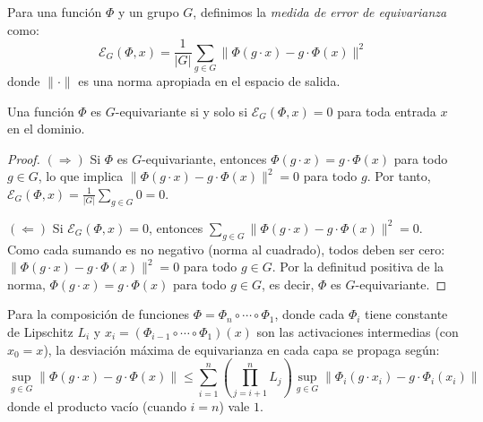\begin{definition}\label{def:error_equivarianza}
Para una función $\Phi$ y un grupo $G$, definimos la \textit{medida de error de equivarianza} como:
\begin{equation}
\mathcal{E}_G(\Phi, x) = \frac{1}{|G|} \sum_{g \in G} \|\Phi(g \cdot x) - g \cdot \Phi(x)\|^2
\end{equation}
donde $\|\cdot\|$ es una norma apropiada en el espacio de salida.
\end{definition}

\begin{theorem}\label{thm:criterio_equivarianza}
Una función $\Phi$ es $G$-equivariante si y solo si $\mathcal{E}_G(\Phi, x) = 0$ para toda entrada $x$ en el dominio.
\end{theorem}

\begin{proof}
$(\Rightarrow)$ Si $\Phi$ es $G$-equivariante, entonces $\Phi(g \cdot x) = g \cdot \Phi(x)$ para todo $g \in G$, lo que implica $\|\Phi(g \cdot x) - g \cdot \Phi(x)\|^2 = 0$ para todo $g$. Por tanto, $\mathcal{E}_G(\Phi, x) = \frac{1}{|G|} \sum_{g \in G} 0 = 0$.

$(\Leftarrow)$ Si $\mathcal{E}_G(\Phi, x) = 0$, entonces $\sum_{g \in G} \|\Phi(g \cdot x) - g \cdot \Phi(x)\|^2 = 0$. Como cada sumando es no negativo (norma al cuadrado), todos deben ser cero: $\|\Phi(g \cdot x) - g \cdot \Phi(x)\|^2 = 0$ para todo $g \in G$. Por la definitud positiva de la norma, $\Phi(g \cdot x) = g \cdot \Phi(x)$ para todo $g \in G$, es decir, $\Phi$ es $G$-equivariante.
\end{proof}

\begin{proposition}\label{prop:propagacion_error}
Para la composición de funciones $\Phi = \Phi_n \circ \cdots \circ \Phi_1$, donde cada $\Phi_i$ tiene constante de Lipschitz $L_i$ y $x_i = (\Phi_{i-1} \circ \cdots \circ \Phi_1)(x)$ son las activaciones intermedias (con $x_0 = x$), la desviación máxima de equivarianza en cada capa se propaga según:
\begin{equation}
\sup_{g \in G}\|\Phi(g \cdot x) - g \cdot \Phi(x)\| \leq \sum_{i=1}^{n} \left(\prod_{j=i+1}^{n} L_j\right) \sup_{g \in G}\|\Phi_i(g \cdot x_i) - g \cdot \Phi_i(x_i)\|
\end{equation}
donde el producto vacío (cuando $i = n$) vale $1$.
\end{proposition}

